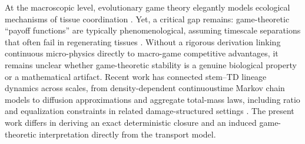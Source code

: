 \documentclass[pdflatex,sn-mathphys-ay]{sn-jnl}
\theoremstyle{thmstyleone}
\theoremstyle{definition}
\theoremstyle{remark}
\begin{document}
At the macroscopic level, evolutionary game theory elegantly models ecological mechanisms of tissue coordination \citep{zhu_integrating_2016,huang_stochastic_2015,argasinski_interaction_2018,helbing_stochastic_1996}. Yet, a critical gap remains: game-theoretic ``payoff functions'' are typically phenomenological, assuming timescale separations that often fail in regenerating tissues \citep{dieckmann_dynamical_1996,dercole_analysis_2008,metz_adaptive_1995,geritz_evolutionarily_1998}. Without a rigorous derivation linking continuous micro-physics directly to macro-game competitive advantages, it remains unclear whether game-theoretic stability is a genuine biological property or a mathematical artifact.
Recent work has connected stem--TD lineage dynamics across scales, from density-dependent continuoustime Markov chain models to diffusion approximations and aggregate total-mass laws, including ratio and equalization constraints in related damage-structured settings \citep{yu_dedifferentiation_2026}. The present work differs in deriving an exact deterministic closure and an induced game-theoretic interpretation directly from the transport model.
\end{document}
